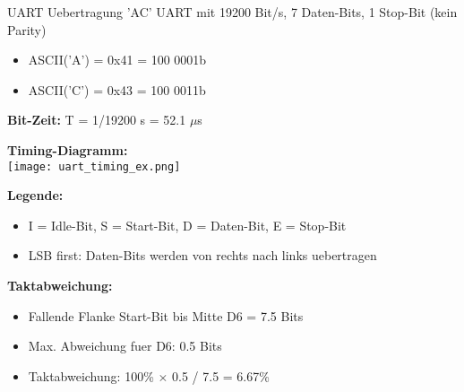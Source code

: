 \begin{example2}{UART Uebertragung 'AC'}
    UART mit 19200 Bit/s, 7 Daten-Bits, 1 Stop-Bit (kein Parity)
    \begin{itemize}
        \item ASCII('A') = 0x41 = 100 0001b
        \item ASCII('C') = 0x43 = 100 0011b
    \end{itemize}
    
    \tcblower
    
    \textbf{Bit-Zeit:} T = 1/19200 s = 52.1 $\mu$s
    
    \textbf{Timing-Diagramm:}\\
    \texttt{[image: uart\_timing\_ex.png]}
    
    \textbf{Legende:}
    \begin{itemize}
        \item I = Idle-Bit, S = Start-Bit, D = Daten-Bit, E = Stop-Bit
        \item LSB first: Daten-Bits werden von rechts nach links uebertragen
    \end{itemize}
    
    \textbf{Taktabweichung:}
    \begin{itemize}
        \item Fallende Flanke Start-Bit bis Mitte D6 = 7.5 Bits
        \item Max. Abweichung fuer D6: 0.5 Bits
        \item Taktabweichung: 100\% $\times$ 0.5 / 7.5 = 6.67\%
    \end{itemize}
\end{example2}

